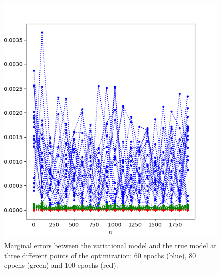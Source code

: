 \documentclass{article}
\begin{document}
\begin{figure}
  \centering
  \includegraphics[width=\linewidth, height=0.6\textwidth]{./marginal_2.png}
  \caption{Marginal errors between the variational model and the true model at three different points of the optimization: 60 epochs (blue), 80 epochs (green) and 100 epochs (red).}
  \label{fig:marginal_linear_gaussian_appendix}
\end{figure}%
\end{document}
